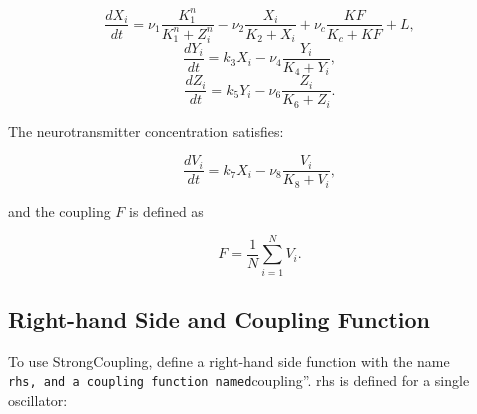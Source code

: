 \documentclass[english,a4paper,oneside]{article}
\begin{document}
\[\frac{dX_i}{dt} = \nu_1 \frac{K_1^n}{K_1^n+Z_i^n} - \nu_2 \frac{X_i}{K_2 + X_i}+ \nu_c \frac{KF}{K_c + KF} + L,\]
\[\frac{dY_i}{dt} = k_3 X_i - \nu_4 \frac{Y_i}{K_4 + Y_i},\]
\[\frac{dZ_i}{dt} = k_5 Y_i - \nu_6 \frac{Z_i}{K_6 + Z_i}.\]

The neurotransmitter concentration satisfies:

\[\frac{dV_i}{dt} = k_7 X_i - \nu_8 \frac{V_i}{K_8 + V_i},\]

and the coupling \(F\) is defined as

\[F = \frac{1}{N}\sum_{i=1}^N V_i.\]

\subsection{Right-hand Side and Coupling
Function}\label{right-hand-side-and-coupling-function}

To use StrongCoupling, define a right-hand side function with the name
\texttt{rhs\textquotesingle{}\textquotesingle{},\ and\ a\ coupling\ function\ named}coupling''.
rhs is defined for a single oscillator:
\end{document}
